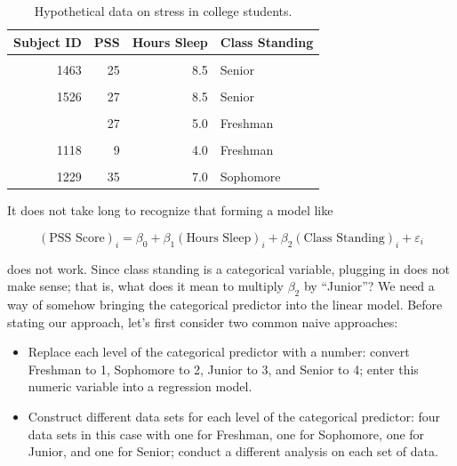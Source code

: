 \documentclass[
  letterpaper,
  DIV=11,
  numbers=noendperiod]{scrreprt}
\providecommand{\tightlist}{%
  \setlength{\itemsep}{0pt}\setlength{\parskip}{0pt}}\usepackage{longtable,booktabs,array}
\theoremstyle{definition}
\theoremstyle{definition}
\theoremstyle{remark}
\begin{document}
\hypertarget{tbl-modeling-categorical-predictors-stress-data}{}
\begin{table}
\caption{\label{tbl-modeling-categorical-predictors-stress-data}Hypothetical data on stress in college students. }\tabularnewline

\centering
\begin{tabular}[t]{rrrl}
\toprule
Subject ID & PSS & Hours Sleep & Class Standing\\
\midrule
\cellcolor{gray!10}{1415} & \cellcolor{gray!10}{14} & \cellcolor{gray!10}{7.5} & \cellcolor{gray!10}{Freshman}\\
1463 & 25 & 8.5 & Senior\\
\cellcolor{gray!10}{1179} & \cellcolor{gray!10}{26} & \cellcolor{gray!10}{7.0} & \cellcolor{gray!10}{Junior}\\
1526 & 27 & 8.5 & Senior\\
\cellcolor{gray!10}{1195} & \cellcolor{gray!10}{5} & \cellcolor{gray!10}{8.0} & \cellcolor{gray!10}{Sophomore}\\
\addlinespace
1938 & 27 & 5.0 & Freshman\\
\cellcolor{gray!10}{1818} & \cellcolor{gray!10}{28} & \cellcolor{gray!10}{5.5} & \cellcolor{gray!10}{Junior}\\
1118 & 9 & 4.0 & Freshman\\
\cellcolor{gray!10}{1299} & \cellcolor{gray!10}{29} & \cellcolor{gray!10}{9.0} & \cellcolor{gray!10}{Freshman}\\
1229 & 35 & 7.0 & Sophomore\\
\bottomrule
\end{tabular}
\end{table}

It does not take long to recognize that forming a model like

\[(\text{PSS Score})_i = \beta_0 + \beta_1 (\text{Hours Sleep})_i + \beta_2 (\text{Class Standing})_i + \varepsilon_i\]

does not work. Since class standing is a categorical variable, plugging
in does not make sense; that is, what does it mean to multiply
\(\beta_2\) by ``Junior''? We need a way of somehow bringing the
categorical predictor into the linear model. Before stating our
approach, let's first consider two common naive approaches:

\begin{itemize}
\tightlist
\item
  Replace each level of the categorical predictor with a number: convert
  Freshman to 1, Sophomore to 2, Junior to 3, and Senior to 4; enter
  this numeric variable into a regression model.
\item
  Construct different data sets for each level of the categorical
  predictor: four data sets in this case with one for Freshman, one for
  Sophomore, one for Junior, and one for Senior; conduct a different
  analysis on each set of data.
\end{itemize}
\end{document}
